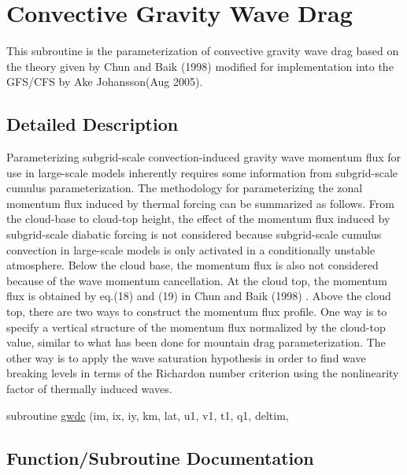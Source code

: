 \hypertarget{group__convective}{}\section{Convective Gravity Wave Drag}
\label{group__convective}


This subroutine is the parameterization of convective gravity wave drag based on the theory given by Chun and Baik (1998) \cite{chun_and_baik_1998} modified for implementation into the G\+F\+S/\+C\+FS by Ake Johansson(\+Aug 2005).  




\subsection{Detailed Description}
Parameterizing subgrid-\/scale convection-\/induced gravity wave momentum flux for use in large-\/scale models inherently requires some information from subgrid-\/scale cumulus parameterization. The methodology for parameterizing the zonal momentum flux induced by thermal forcing can be summarized as follows. From the cloud-\/base to cloud-\/top height, the effect of the momentum flux induced by subgrid-\/scale diabatic forcing is not considered because subgrid-\/scale cumulus convection in large-\/scale models is only activated in a conditionally unstable atmosphere. Below the cloud base, the momentum flux is also not considered because of the wave momentum cancellation. At the cloud top, the momentum flux is obtained by eq.(18) and (19) in Chun and Baik (1998) \cite{chun_and_baik_1998}. Above the cloud top, there are two ways to construct the momentum flux profile. One way is to specify a vertical structure of the momentum flux normalized by the cloud-\/top value, similar to what has been done for mountain drag parameterization. The other way is to apply the wave saturation hypothesis in order to find wave breaking levels in terms of the Richardon number criterion using the nonlinearity factor of thermally induced waves. \begin{DoxyCompactItemize}
\item 
subroutine \hyperlink{group__convective_ga722b7730110e3c91524ccf414eab9dfe}{gwdc} (im, ix, iy, km, lat, u1, v1, t1, q1, deltim,
\end{DoxyCompactItemize}


\subsection{Function/\+Subroutine Documentation}
\mbox{\label{group__convective_ga722b7730110e3c91524ccf414eab9dfe}} 

